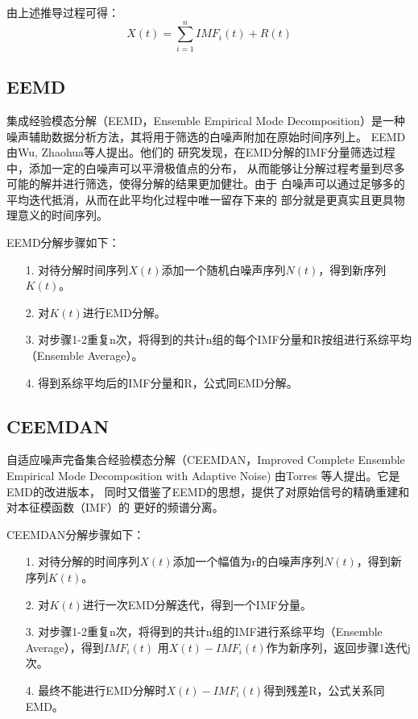 \documentclass[AutoFakeBold]{LZUThesis}
\begin{document}
由上述推导过程可得：
$$
X(t)=\displaystyle\sum_{i=1} ^n IMF_i(t) +R(t)
$$

\subsection{EEMD}

集成经验模态分解（EEMD，Ensemble Empirical Mode Decomposition）是一种
噪声辅助数据分析方法，其将用于筛选的白噪声附加在原始时间序列上。
EEMD由Wu, Zhaohua等人提出。他们的
研究发现，在EMD分解的IMF分量筛选过程中，添加一定的白噪声可以平滑极值点的分布，
从而能够让分解过程考量到尽多可能的解并进行筛选，使得分解的结果更加健壮。由于
白噪声可以通过足够多的平均迭代抵消，从而在此平均化过程中唯一留存下来的
部分就是更真实且更具物理意义的时间序列。

EEMD分解步骤如下：
\begin{itemize}
\item[1. ] 对待分解时间序列$X(t)$添加一个随机白噪声序列$N(t)$，得到新序列$K(t)$。
\item[2. ] 对$K(t)$进行EMD分解。
\item[3. ] 对步骤1-2重复n次，将得到的共计n组的每个IMF分量和R按组进行系综平均（Ensemble Average）。
\item[4. ] 得到系综平均后的IMF分量和R，公式同EMD分解。
\end{itemize}

\subsection{CEEMDAN}
自适应噪声完备集合经验模态分解（CEEMDAN，Improved Complete Ensemble
Empirical Mode Decomposition with Adaptive Noise) 由Torres
等人提出。它是EMD的改进版本，
同时又借鉴了EEMD的思想，提供了对原始信号的精确重建和对本征模函数（IMF）的
更好的频谱分离。

CEEMDAN分解步骤如下：
\begin{itemize}
\item[1. ] 对待分解的时间序列$X(t)$添加一个幅值为r的白噪声序列$N(t)$，得到新序列$K(t)$。
\item[2. ] 对$K(t)$进行一次EMD分解迭代，得到一个IMF分量。
\item[3. ] 对步骤1-2重复n次，将得到的共计n组的IMF进行系综平均（Ensemble Average），得到$IMF_i(t)$
用$X(t)-IMF_i(t)$作为新序列，返回步骤1迭代j次。
\item[4. ] 最终不能进行EMD分解时$X(t)-IMF_i(t)$得到残差R，公式关系同EMD。
\end{itemize}
\end{document}
